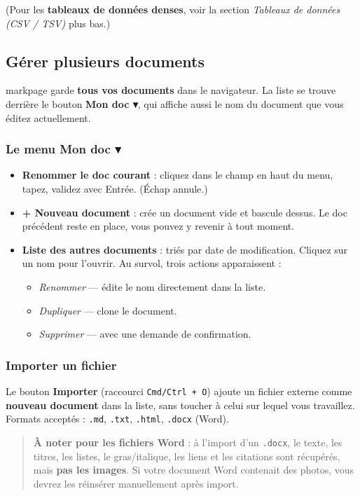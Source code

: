 \documentclass[11pt,a4paper]{article}
\theoremstyle{definition}
\begin{document}
(Pour les \textbf{tableaux de données denses}, voir la section \emph{Tableaux
de données (CSV / TSV)} plus bas.)


\subsection{Gérer plusieurs documents}

markpage garde \textbf{tous vos documents} dans le navigateur. La liste se
trouve derrière le bouton \textbf{Mon doc ▾}, qui affiche aussi le nom
du document que vous éditez actuellement.


\subsubsection{Le menu Mon doc ▾}

\begin{itemize}
  \item \textbf{Renommer le doc courant} : cliquez dans le champ en haut du
menu, tapez, validez avec Entrée. (Échap annule.)
  \item \textbf{+ Nouveau document} : crée un document vide et bascule
dessus. Le doc précédent reste en place, vous pouvez y revenir
à tout moment.
  \item \textbf{Liste des autres documents} : triés par date de modification.
Cliquez sur un nom pour l'ouvrir. Au survol, trois actions
apparaissent :

\begin{itemize}
  \item \emph{Renommer} — édite le nom directement dans la liste.
  \item \emph{Dupliquer} — clone le document.
  \item \emph{Supprimer} — avec une demande de confirmation.
\end{itemize}
\end{itemize}


\subsubsection{Importer un fichier}

Le bouton \textbf{Importer} (raccourci \texttt{Cmd/Ctrl + O}) ajoute un fichier
externe comme \textbf{nouveau document} dans la liste, sans toucher à
celui sur lequel vous travaillez. Formats acceptés : \texttt{.md},
\texttt{.txt}, \texttt{.html}, \texttt{.docx} (Word).


\begin{quote}
\textbf{À noter pour les fichiers Word} : à l'import d'un \texttt{.docx}, le
texte, les titres, les listes, le gras/italique, les liens et les
citations sont récupérés, mais \textbf{pas les images}. Si votre
document Word contenait des photos, vous devrez les réinsérer
manuellement après import.
\end{quote}
\end{document}
